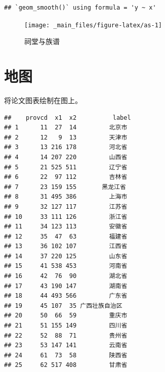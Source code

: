 \documentclass[
]{book}
\newenvironment{Shaded}{\begin{snugshade}}{\end{snugshade}}
\newcommand{\AttributeTok}[1]{\textcolor[rgb]{0.13,0.29,0.53}{#1}}
\newcommand{\FunctionTok}[1]{\textcolor[rgb]{0.13,0.29,0.53}{\textbf{#1}}}
\newcommand{\NormalTok}[1]{#1}
\newcommand{\OtherTok}[1]{\textcolor[rgb]{0.56,0.35,0.01}{#1}}
\newcommand{\SpecialCharTok}[1]{\textcolor[rgb]{0.81,0.36,0.00}{\textbf{#1}}}
\newcommand{\StringTok}[1]{\textcolor[rgb]{0.31,0.60,0.02}{#1}}
\begin{document}
\begin{verbatim}
## `geom_smooth()` using formula = 'y ~ x'
\end{verbatim}

\begin{figure}

{\centering \texttt{[image: \_main\_files/figure-latex/as-1]} 

}

\caption{祠堂与族谱}\label{fig:as}
\end{figure}

\hypertarget{ux5730ux56fe}{%
\section{地图}\label{ux5730ux56fe}}

将论文图表绘制在图上。

\begin{Shaded}
\end{Shaded}

\begin{verbatim}
##    provcd  x1  x2          label
## 1      11  27  14         北京市
## 2      12   9  13         天津市
## 3      13 216 178         河北省
## 4      14 207 220         山西省
## 5      21 525 511         辽宁省
## 6      22  97 112         吉林省
## 7      23 159 155       黑龙江省
## 8      31 495 386         上海市
## 9      32 127 117         江苏省
## 10     33 111 126         浙江省
## 11     34 123 113         安徽省
## 12     35  47  63         福建省
## 13     36 102 107         江西省
## 14     37 220 125         山东省
## 15     41 538 453         河南省
## 16     42  76  90         湖北省
## 17     43 190 147         湖南省
## 18     44 493 566         广东省
## 19     45 107  35 广西壮族自治区
## 20     50  66  59         重庆市
## 21     51 155 149         四川省
## 22     52  88  71         贵州省
## 23     53 147 141         云南省
## 24     61  73  58         陕西省
## 25     62 517 408         甘肃省
\end{verbatim}
\end{document}
